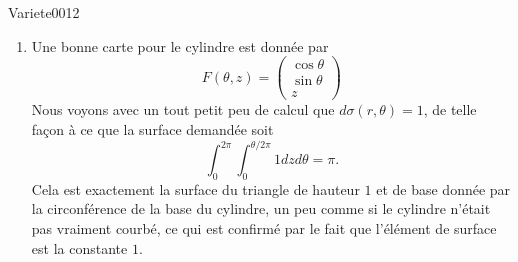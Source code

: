 \begin{corrige}{Variete0012}
\begin{enumerate}
		\item
			Une bonne carte pour le cylindre est donnée par
			\begin{equation}
				F(\theta,z)=\begin{pmatrix}
					\cos\theta	\\ 
					\sin\theta	\\ 
					z	
				\end{pmatrix}
			\end{equation}
			Nous voyons avec un tout petit peu de calcul que $d\sigma(r,\theta)=1$, de telle façon à ce que la surface demandée soit
			\begin{equation}
				\int_0^{2\pi}\int_0^{\theta/2\pi}1 dzd\theta=\pi.
			\end{equation}
			Cela est exactement la surface du triangle de hauteur $1$ et de base donnée par la circonférence de la base du cylindre, un peu comme si le cylindre n'était pas vraiment courbé, ce qui est confirmé par le fait que l'élément de surface est la constante $1$.

	\end{enumerate}
	

\end{corrige}
